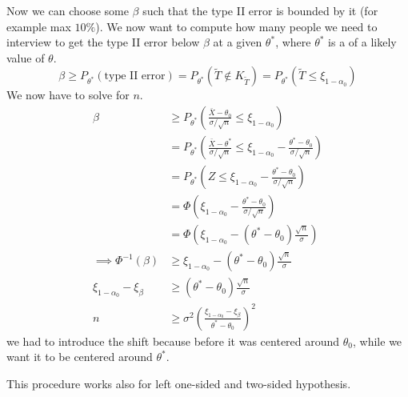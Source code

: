 \documentclass[12pt]{extarticle}
\begin{document}
Now we can choose some $\beta$ such that the type II error is bounded by it (for example max $10\%$).
We now want to compute how many people we need to interview to get the type II error below $\beta$ at a given $\theta^*$, where $\theta^*$ is a  of a likely value of $\theta$.
\begin{equation}
	\beta \geq P_{\theta^*}(\text{type II error}) = P_{\theta^*}(\tilde T \notin K_{\tilde T}) = P_{\theta^*}(\tilde T \leq \xi_{1-\alpha_0})
\end{equation}
We now have to solve for $n$.
\begin{align}
	\beta                          & \geq P_{\theta^*}\left(\frac{\bar X - \theta_0}{\sigma / \sqrt n} \leq \xi_{1-\alpha_0}\right)                                              \\
	                               & = P_{\theta^*}\left(\frac{\bar X - \theta^*}{\sigma / \sqrt n} \leq \xi_{1-\alpha_0}  - \frac{\theta^* - \theta_0}{\sigma / \sqrt n}\right) \\
	                               & = P_{\theta^*}\left(Z \leq \xi_{1-\alpha_0}  - \frac{\theta^* - \theta_0}{\sigma / \sqrt n}\right)                                          \\
	                               & = \Phi\left(\xi_{1-\alpha_0}  - \frac{\theta^* - \theta_0}{\sigma / \sqrt n}\right)                                                         \\
	                               & = \Phi\left(\xi_{1-\alpha_0}  - (\theta^* - \theta_0) \frac{\sqrt n}{\sigma}\right)                                                         \\
	\implies \Phi^{-1}(\beta)      & \geq \xi_{1-\alpha_0}  - (\theta^* - \theta_0) \frac{\sqrt n}{\sigma}                                                                       \\
	\xi_{1-\alpha_0} - \xi_{\beta} & \geq (\theta^* - \theta_0) \frac{\sqrt n}{\sigma}                                                                                           \\
	n                              & \geq \sigma^2 \left(\frac{\xi_{1-\alpha_0} - \xi_{\beta}}{\theta^* - \theta_0}\right)^2
\end{align}
we had to introduce the shift because before it was centered around $\theta_0$, while we want it to be centered around $\theta^*$.

This procedure works also for left one-sided and two-sided hypothesis.
\end{document}
